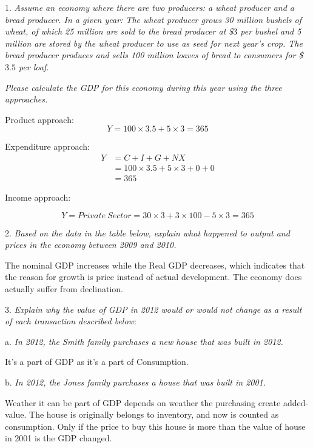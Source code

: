 \documentclass[10pt, a4paper]{article}
\begin{document}
    1. \emph{Assume an economy where there are two producers: a wheat producer and a bread
    producer. In a given year: The wheat producer grows 30 million bushels of wheat, of which 25 million are sold to the bread producer at \$$3$ per bushel and 5 million are stored by the wheat producer to use as seed for next year’s crop. The bread producer produces and sells 100 million loaves of bread to consumers for \$ $3.5$ per loaf.}
    \newline

    \emph{Please calculate the GDP for this economy during this year using the three approaches.} 
    \newline
    
    Product approach: 
    $$Y = 100 \times 3.5 + 5 \times 3 = 365$$
    
    Expenditure approach: 
    \begin{align*}
        Y &= C + I + G + NX \\
          &= 100 \times 3.5 + 5 \times 3 + 0 + 0 \\
          &= 365
    \end{align*}

    Income approach: 

    $$Y = Private\ Sector = 30 \times 3 + 3 \times 100 - 5 \times 3 = 365$$ \newpage

    2. \emph{Based on the data in the table below, explain what happened to output and prices in
    the economy between 2009 and 2010.}

        The nominal GDP increases while the Real GDP decreases, which indicates that the reason for growth is price instead of actual development. The economy does actually suffer from declination.\newline

    3. \emph{Explain why the value of GDP in 2012 would or would not change as a result of each transaction described below}:

        a. \emph{In 2012, the Smith family purchases a new house that was built in 2012.}

        It's a part of GDP as it's a part of Consumption.\newline

        b. \emph{In 2012, the Jones family purchases a house that was built in 2001.}

        Weather it can be part of GDP depends on weather the purchasing create added-value. The house is originally belongs to inventory, and now is counted as consumption. Only if the price to buy this house is more than the value of house in 2001 is the GDP changed.\newline
\end{document}
